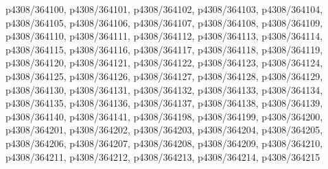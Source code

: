 p4308/364100, p4308/364101, p4308/364102, p4308/364103, p4308/364104, p4308/364105, p4308/364106,
p4308/364107, p4308/364108, p4308/364109, p4308/364110, p4308/364111, p4308/364112, p4308/364113,
p4308/364114, p4308/364115, p4308/364116, p4308/364117, p4308/364118, p4308/364119, p4308/364120,
p4308/364121, p4308/364122, p4308/364123, p4308/364124, p4308/364125, p4308/364126, p4308/364127,
p4308/364128, p4308/364129, p4308/364130, p4308/364131, p4308/364132, p4308/364133, p4308/364134,
p4308/364135, p4308/364136, p4308/364137, p4308/364138, p4308/364139, p4308/364140, p4308/364141,
p4308/364198, p4308/364199, p4308/364200, p4308/364201, p4308/364202, p4308/364203, p4308/364204,
p4308/364205, p4308/364206, p4308/364207, p4308/364208, p4308/364209, p4308/364210, p4308/364211,
p4308/364212, p4308/364213, p4308/364214, p4308/364215